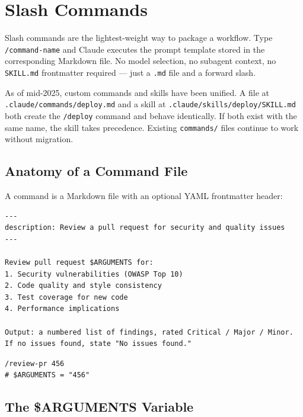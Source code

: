 \chapter{Slash Commands}
\label{ch:commands}


Slash commands are the lightest-weight way to package a workflow. Type
\texttt{/command-name} and Claude executes the prompt template stored in
the corresponding Markdown file. No model selection, no subagent context,
no \texttt{SKILL.md} frontmatter required — just a \texttt{.md} file and a
forward slash.

\begin{notebox}
As of mid-2025, custom commands and skills have been unified. A file at
\texttt{.claude/commands/deploy.md} and a skill at
\texttt{.claude/skills/deploy/SKILL.md} both create the \texttt{/deploy}
command and behave identically. If both exist with the same name, the skill
takes precedence. Existing \texttt{commands/} files continue to work without
migration.
\end{notebox}

\section{Anatomy of a Command File}
\label{sec:command-anatomy}

A command is a Markdown file with an optional YAML frontmatter header:

\begin{lstlisting}[caption={A minimal command: \texttt{.claude/commands/review-pr.md}}]
---
description: Review a pull request for security and quality issues
---

Review pull request $ARGUMENTS for:
1. Security vulnerabilities (OWASP Top 10)
2. Code quality and style consistency
3. Test coverage for new code
4. Performance implications

Output: a numbered list of findings, rated Critical / Major / Minor.
If no issues found, state "No issues found."
\end{lstlisting}

\begin{lstlisting}[caption={Invoking the command}]
/review-pr 456
# $ARGUMENTS = "456"
\end{lstlisting}

\section{The \$ARGUMENTS Variable}
\label{sec:command-arguments}

